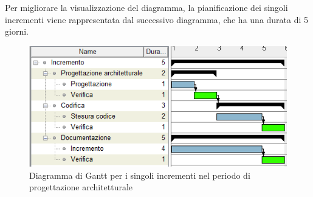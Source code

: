 Per migliorare la visualizzazione del diagramma, la pianificazione dei singoli incrementi viene rappresentata dal successivo diagramma, che ha una durata di 5 giorni.\\

\begin{figure}[H]
\centering

\centerline{\includegraphics[scale=1]{res/Pianificazione/Gantt/incProgettazione.PNG}}
\caption{Diagramma di Gantt per i singoli incrementi nel periodo di progettazione architetturale}
\end{figure}